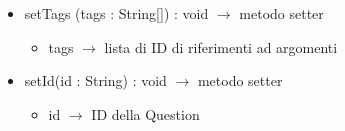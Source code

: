 \begin{description}
\begin{itemize}
	\item setTags (tags  : String[]) : void $\rightarrow$ metodo setter\begin{itemize}
		\item tags  $\rightarrow$ lista di ID di riferimenti ad argomenti
	\end{itemize}
	
	\item setId(id : String) : void $\rightarrow$ metodo setter\begin{itemize}
		\item id $\rightarrow$ ID della Question
	\end{itemize}
	
\end{itemize}

\end{description}

